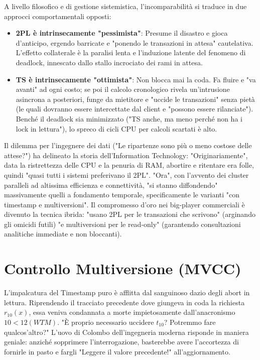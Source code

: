 A livello filosofico e di gestione sistemistica, l'incomparabilità si traduce in due approcci comportamentali opposti:
\begin{itemize}
    \item \textbf{2PL è intrinsecamente "pessimista"}: Presume il disastro e gioca d'anticipo, ergendo barricate e "ponendo le transazioni in attesa" cautelativa. L'effetto collaterale è la paralisi lenta e l'induzione latente del fenomeno di deadlock, innescato dallo stallo incrociato dei rami in attesa.
    \item \textbf{TS è intrinsecamente "ottimista"}: Non blocca mai la coda. Fa fluire e "va avanti" ad ogni costo; se poi il calcolo cronologico rivela un'intrusione asincrona a posteriori, funge da mietitore e "uccide le transazioni" senza pietà (le quali dovranno essere intercettate dal client e "possono essere rilanciate"). Benché il deadlock sia minimizzato ("TS anche, ma meno perché non ha i lock in lettura"), lo spreco di cicli CPU per calcoli scartati è alto.
\end{itemize}

Il dilemma per l'ingegnere dei dati ("Le ripartenze sono più o meno costose delle attese?") ha delineato la storia dell'Information Technology:
"Originariamente", data la ristrettezza delle CPU e la penuria di RAM, abortire e ritentare era folle, quindi "quasi tutti i sistemi preferivano il 2PL". "Ora", con l'avvento dei cluster paralleli ad altissima efficienza e connettività, "si stanno diffondendo" massivamente quelli a fondamento temporale, specificamente le varianti "con timestamp e multiversioni". Il compromesso d'oro nei big-player commerciali è divenuto la tecnica ibrida: "usano 2PL per le transazioni che scrivono" (arginando gli omicidi futili) "e multiversioni per le read-only" (garantendo consultazioni analitiche immediate e non bloccanti).

\section{Controllo Multiversione (MVCC)}

L'impalcatura del Timestamp puro è afflitta dal sanguinoso dazio degli abort in lettura. Riprendendo il tracciato precedente dove giungeva in coda la richiesta $r_{10}(x)$, essa veniva condannata a morte impietosamente dall'anacronismo $10 < 12(WTM)$. "È proprio necessario uccidere $t_{10}$? Potremmo fare qualcos'altro?"
L'uovo di Colombo dell'ingegneria moderna risponde in maniera geniale: anziché sopprimere l'interrogazione, basterebbe avere l'accortezza di fornirle in pasto e fargli "Leggere il valore precedente!" all'aggiornamento.

